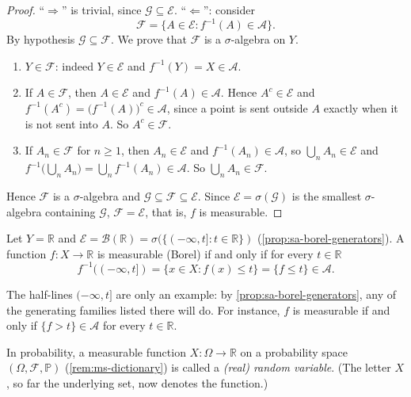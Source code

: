 \begin{proof}
``$\Rightarrow$'' is trivial, since $\mathcal G\subseteq\mathcal E$. ``$\Leftarrow$'': consider
\[
  \mathcal F=\{A\in\mathcal E:f^{-1}(A)\in\mathcal A\}.
\]
By hypothesis $\mathcal G\subseteq\mathcal F$. We prove that $\mathcal F$ is a $\sigma$-algebra
on $Y$.
\begin{enumerate}[label=(\arabic*)]
  \item $Y\in\mathcal F$: indeed $Y\in\mathcal E$ and $f^{-1}(Y)=X\in\mathcal A$.
  \item If $A\in\mathcal F$, then $A\in\mathcal E$ and $f^{-1}(A)\in\mathcal A$. Hence
    $A^c\in\mathcal E$ and $f^{-1}(A^c)=\big(f^{-1}(A)\big)^c\in\mathcal A$, since a point is
    sent outside $A$ exactly when it is not sent into $A$. So $A^c\in\mathcal F$.
  \item If $A_n\in\mathcal F$ for $n\ge1$, then $A_n\in\mathcal E$ and
    $f^{-1}(A_n)\in\mathcal A$, so $\bigcup_nA_n\in\mathcal E$ and
    $f^{-1}\big(\bigcup_nA_n\big)=\bigcup_nf^{-1}(A_n)\in\mathcal A$. So
    $\bigcup_nA_n\in\mathcal F$.
\end{enumerate}
Hence $\mathcal F$ is a $\sigma$-algebra and $\mathcal G\subseteq\mathcal F\subseteq\mathcal E$.
Since $\mathcal E=\sigma(\mathcal G)$ is the smallest $\sigma$-algebra containing $\mathcal G$,
$\mathcal F=\mathcal E$, that is, $f$ is measurable.
\end{proof}

\begin{corollary}\label{cor:mf-real}
Let $Y=\mathbb R$ and $\mathcal E=\mathcal B(\mathbb R)=\sigma(\{(-\infty,t]:t\in\mathbb R\})$
(\cref{prop:sa-borel-generators}). A function $f:X\to\mathbb R$ is measurable (Borel) if and
only if for every $t\in\mathbb R$
\[
  f^{-1}((-\infty,t])=\{x\in X:f(x)\le t\}=\{f\le t\}\in\mathcal A .
\]
\end{corollary}

The half-lines $(-\infty,t]$ are only an example: by \cref{prop:sa-borel-generators}, any of
the generating families listed there will do. For instance, $f$ is measurable if and only if
$\{f>t\}\in\mathcal A$ for every $t\in\mathbb R$.

\begin{definition}\label{def:mf-random-variable}
In probability, a measurable function $X:\Omega\to\mathbb R$ on a probability space
$(\Omega,\mathcal F,\mathbb P)$ (\cref{rem:ms-dictionary}) is called a \emph{(real) random
variable}. (The letter $X$, so far the underlying set, now denotes the function.)
\end{definition}

